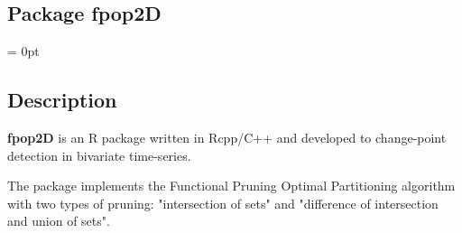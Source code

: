 \documentclass{report}
\begin{document}
	\begin{center} \section*{Package fpop2D}\end{center}
	\parindent = 0pt
	\subsection*{Description}
	
	{\bfseries fpop2D} is an R package written in Rcpp/C++ and developed to change-point detection in bivariate time-series.
	
	The package implements the Functional Pruning Optimal Partitioning algorithm with two types of pruning: "intersection of sets" and "difference of intersection and union of sets". 
\end{document}
